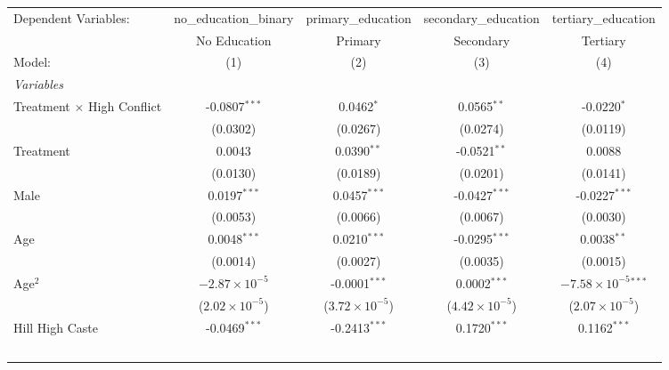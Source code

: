 
\begingroup
\centering
\begin{tabular}{lcccc}
   \tabularnewline \midrule \midrule
   Dependent Variables:              & no\_education\_binary   & primary\_education      & secondary\_education    & tertiary\_education\\   
                                     & No Education            & Primary                 & Secondary               & Tertiary \\   
   Model:                            & (1)                     & (2)                     & (3)                     & (4)\\  
   \midrule
   \emph{Variables}\\
   Treatment $\times$ High Conflict  & -0.0807$^{***}$         & 0.0462$^{*}$            & 0.0565$^{**}$           & -0.0220$^{*}$\\   
                                     & (0.0302)                & (0.0267)                & (0.0274)                & (0.0119)\\   
   Treatment                         & 0.0043                  & 0.0390$^{**}$           & -0.0521$^{**}$          & 0.0088\\   
                                     & (0.0130)                & (0.0189)                & (0.0201)                & (0.0141)\\   
   Male                              & 0.0197$^{***}$          & 0.0457$^{***}$          & -0.0427$^{***}$         & -0.0227$^{***}$\\   
                                     & (0.0053)                & (0.0066)                & (0.0067)                & (0.0030)\\   
   Age                               & 0.0048$^{***}$          & 0.0210$^{***}$          & -0.0295$^{***}$         & 0.0038$^{**}$\\   
                                     & (0.0014)                & (0.0027)                & (0.0035)                & (0.0015)\\   
   Age$^2$                           & $-2.87\times 10^{-5}$   & -0.0001$^{***}$         & 0.0002$^{***}$          & $-7.58\times 10^{-5}$$^{***}$\\    
                                     & ($2.02\times 10^{-5}$)  & ($3.72\times 10^{-5}$)  & ($4.42\times 10^{-5}$)  & ($2.07\times 10^{-5}$)\\    
   Hill High Caste                   & -0.0469$^{***}$         & -0.2413$^{***}$         & 0.1720$^{***}$          & 0.1162$^{***}$\\   
$$
\end{tabular}
